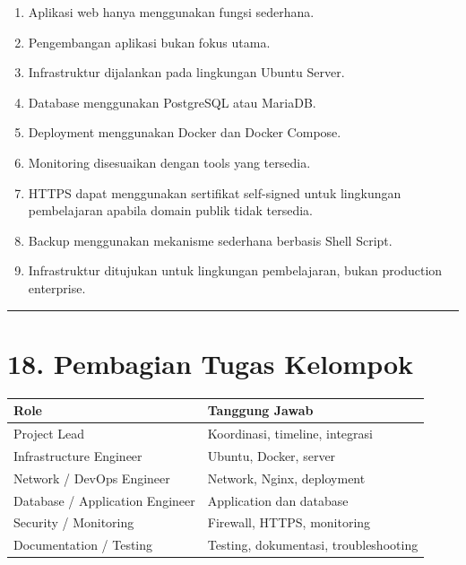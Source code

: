 \documentclass[
]{article}
\providecommand{\tightlist}{%
  \setlength{\itemsep}{0pt}\setlength{\parskip}{0pt}}
\begin{document}
\begin{enumerate}
\def\labelenumi{\arabic{enumi}.}
\tightlist
\item
  Aplikasi web hanya menggunakan fungsi sederhana.
\item
  Pengembangan aplikasi bukan fokus utama.
\item
  Infrastruktur dijalankan pada lingkungan Ubuntu Server.
\item
  Database menggunakan PostgreSQL atau MariaDB.
\item
  Deployment menggunakan Docker dan Docker Compose.
\item
  Monitoring disesuaikan dengan tools yang tersedia.
\item
  HTTPS dapat menggunakan sertifikat self-signed untuk lingkungan
  pembelajaran apabila domain publik tidak tersedia.
\item
  Backup menggunakan mekanisme sederhana berbasis Shell Script.
\item
  Infrastruktur ditujukan untuk lingkungan pembelajaran, bukan
  production enterprise.
\end{enumerate}

\begin{center}\rule{0.5\linewidth}{0.5pt}\end{center}

\section{18. Pembagian Tugas Kelompok}\label{pembagian-tugas-kelompok}

\begin{longtable}[]{@{}
  >{\raggedright\arraybackslash}p{}
  >{\raggedright\arraybackslash}p{}@{}}
\toprule\noalign{}
\begin{minipage}[b]{\linewidth}\raggedright
Role
\end{minipage} & \begin{minipage}[b]{\linewidth}\raggedright
Tanggung Jawab
\end{minipage} \\
\midrule\noalign{}
\endhead
\bottomrule\noalign{}
\endlastfoot
Project Lead & Koordinasi, timeline, integrasi \\
Infrastructure Engineer & Ubuntu, Docker, server \\
Network / DevOps Engineer & Network, Nginx, deployment \\
Database / Application Engineer & Application dan database \\
Security / Monitoring & Firewall, HTTPS, monitoring \\
Documentation / Testing & Testing, dokumentasi, troubleshooting \\
\end{longtable}
\end{document}
